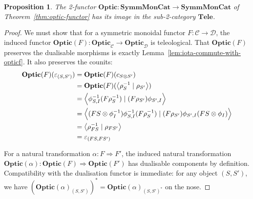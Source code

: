 \documentclass[11pt,letterpaper]{article}
\theoremstyle{plain}
\newtheorem{proposition}[theorem]{Proposition}
\theoremstyle{definition}
\newcommand{\C}{\mathscr{C}}
\newcommand{\D}{\mathscr{D}}
\newcommand{\SymmMonCat}{\mathbf{SymmMonCat}}
\newcommand{\Tele}{\mathbf{Tele}}
\newcommand{\Optic}{\mathbf{Optic}}
\newcommand{\rep}[2]{{\ensuremath \left\langle #1 \mid #2 \right\rangle}}
\newcommand{\hto}{\ensuremath{\,\mathaccent\shortmid\rightarrow\,}}
\begin{document}
\begin{proposition}
  The 2-functor $\Optic : \SymmMonCat \to \SymmMonCat$ of Theorem~\ref{thm:optic-functor} has its image in the sub-2-category $\Tele$.
\end{proposition}
\begin{proof}
  We must show that for a symmetric monoidal functor $F : \C \to \D$, the induced functor $\Optic(F) : \Optic_\C \to \Optic_\D$ is teleological. That $\Optic(F)$ preserves the dualisable morphisms is exactly Lemma~\ref{lem:iota-commute-with-opticf}. It also preserves the counits:
  \begin{align*}
    \Optic(F)(\varepsilon_{(S, S')})
    &= \Optic(F)(c_{S \otimes S'}) \\
    &= \Optic(F)(\rep{\rho_S^{-1}}{\rho_{S'}}) \\
    &= \rep{\phi^{-1}_{S,I} (F \rho_S^{-1})}{(F \rho_{S'}) \phi_{S',I}} \\
    &= \rep{(FS \otimes \phi_I^{-1}) \phi^{-1}_{S,I} (F \rho_S^{-1})}{(F \rho_{S'}) \phi_{S',I} (FS \otimes \phi_I)} \\
    &= \rep{\rho_{FS}^{-1}}{\rho_{FS'}} \\
    &= \varepsilon_{(FS, FS')}
  \end{align*}

For a natural transformation $\alpha : F \Rightarrow F'$, the induced natural transformation $\Optic(\alpha) : \Optic(F) \Rightarrow \Optic(F')$ has dualisable components by definition. Compatibility with the dualisation functor is immediate: for any object $(S, S')$, we have $({\Optic(\alpha)}_{(S, S')})^* = {\Optic(\alpha)}_{(S, S')^*}$ on the nose.
\end{proof}

\end{document}
